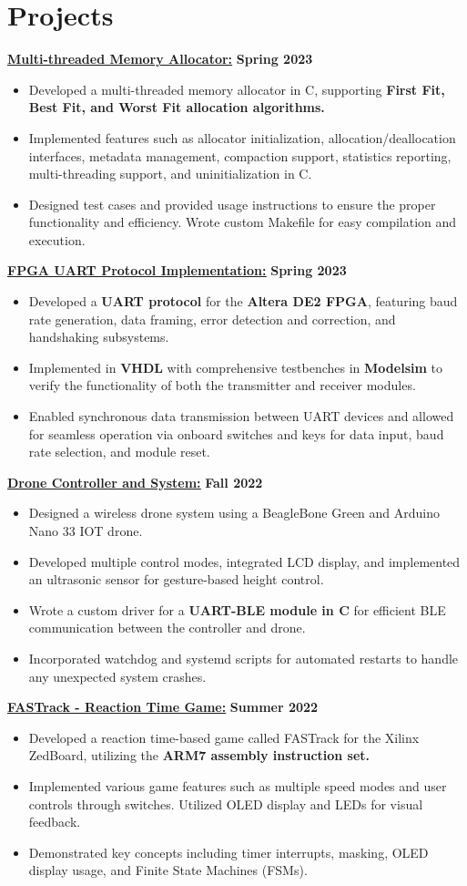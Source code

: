 \documentclass[letterpaper,11pt]{article}
\newcommand{\Item} [1] {
    \item\small{{#1 \vspace{-2pt}}}
}
\newcommand{\resumeItemListStart} [0] {
    \vspace{1pt}
    \begin{itemize}[leftmargin=*,topsep=0pt,itemsep=-2pt]
}
\newcommand{\resumeItemListEnd} [0] {
    \end{itemize}
    \vspace{3pt}
}
\begin{document}
    \section{Projects}
    \href{https://github.com/SatireSage/Multi-threaded-Memory-Allocator}{{\color{colorValue}} \underline{\textbf{Multi-threaded Memory Allocator:}}} \hfill \textbf{Spring 2023}
    \resumeItemListStart{}
        \Item{Developed a multi-threaded memory allocator in C, supporting \textbf{First Fit, Best Fit, and Worst Fit allocation algorithms.}}
        \Item{Implemented features such as allocator initialization, allocation/deallocation interfaces, metadata management, compaction support, statistics reporting, multi-threading support, and uninitialization in C.}
        \Item{Designed test cases and provided usage instructions to ensure the proper functionality and efficiency. Wrote custom Makefile for easy compilation and execution.}
    \resumeItemListEnd{}
    \href{https://github.com/SatireSage/FPGA-UART-Protocol}{{\color{colorValue}} \underline{\textbf{FPGA UART Protocol Implementation:}}} \hfill \textbf{Spring 2023}
    \resumeItemListStart{}
        \Item{Developed a \textbf{UART protocol} for the \textbf{Altera DE2 FPGA}, featuring baud rate generation, data framing, error detection and correction, and handshaking subsystems.}
        \Item{Implemented in \textbf{VHDL} with comprehensive testbenches in \textbf{Modelsim} to verify the functionality of both the transmitter and receiver modules.}
        \Item{Enabled synchronous data transmission between UART devices and allowed for seamless operation via onboard switches and keys for data input, baud rate selection, and module reset.}
    \resumeItemListEnd{}
    \href{https://github.com/SatireSage/Dronee}{{\color{colorValue}} \underline{\textbf{Drone Controller and System:}}} \hfill \textbf{Fall 2022}
    \resumeItemListStart{}
        \Item{Designed a wireless drone system using a BeagleBone Green and Arduino Nano 33 IOT drone.}
        \Item{Developed multiple control modes, integrated LCD display, and implemented an ultrasonic sensor for gesture-based height control.}
        \Item{Wrote a custom driver for a \textbf{UART-BLE module in C} for efficient BLE communication between the controller and drone.}
        \Item{Incorporated watchdog and systemd scripts for automated restarts to handle any unexpected system crashes.}
    \resumeItemListEnd{}
    \href{https://github.com/SatireSage/FASTrack}{{\color{colorValue}} \underline{\textbf{FASTrack - Reaction Time Game:}}} \hfill \textbf{Summer 2022}
    \resumeItemListStart{}
        \Item{Developed a reaction time-based game called FASTrack for the Xilinx ZedBoard, utilizing the \textbf{ARM7 assembly instruction set.}}
        \Item{Implemented various game features such as multiple speed modes and user controls through switches. Utilized OLED display and LEDs for visual feedback.}
        \Item{Demonstrated key concepts including timer interrupts, masking, OLED display usage, and Finite State Machines (FSMs).}
    \resumeItemListEnd{}
\end{document}
